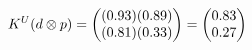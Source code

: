 \documentclass[preview]{standalone}
\begin{document}
\begin{align*}
\special{dvisvgm:raw <g id='unique000'>}K^U(d \otimes p) = \begin{pmatrix} (0.93)(0.89) \\ (0.81)(0.33) \end{pmatrix} = \begin{pmatrix} 0.83 \\ 0.27 \end{pmatrix}\special{dvisvgm:raw </g>}
\end{align*}
\end{document}

